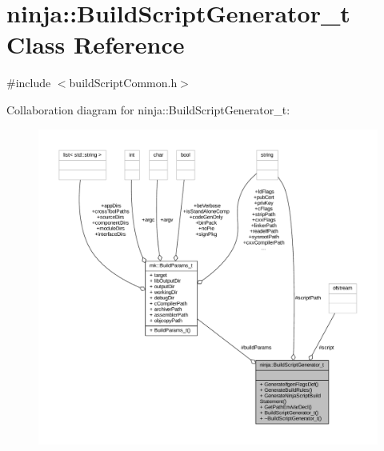 \hypertarget{classninja_1_1_build_script_generator__t}{}\section{ninja\+:\+:Build\+Script\+Generator\+\_\+t Class Reference}
\label{classninja_1_1_build_script_generator__t}


{\ttfamily \#include $<$build\+Script\+Common.\+h$>$}



Collaboration diagram for ninja\+:\+:Build\+Script\+Generator\+\_\+t\+:
\nopagebreak
\begin{figure}[H]
\begin{center}
\leavevmode
\includegraphics[width=350pt]{classninja_1_1_build_script_generator__t__coll__graph}
\end{center}
\end{figure}
